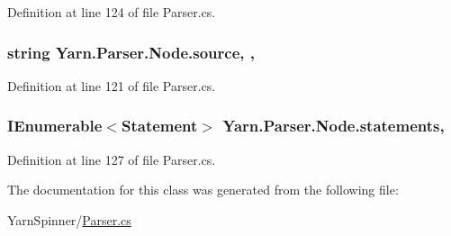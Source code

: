 Definition at line 124 of file Parser.\-cs.

\hypertarget{a00132_a005a6b0f614beb77708fc5ce8fea66e1}{
\subsubsection[{source}]{\setlength{\rightskip}{0pt plus 5cm}string Yarn.\-Parser.\-Node.\-source\hspace{0.3cm}{\ttfamily [get]}, {\ttfamily [set]}, {\ttfamily [package]}}}\label{a00132_a005a6b0f614beb77708fc5ce8fea66e1}


Definition at line 121 of file Parser.\-cs.

\hypertarget{a00132_abdae3fb1c6927b38ce29b1b71a00cb12}{
\subsubsection[{statements}]{\setlength{\rightskip}{0pt plus 5cm}I\-Enumerable$<${\bf Statement}$>$ Yarn.\-Parser.\-Node.\-statements\hspace{0.3cm}{\ttfamily [get]}, {\ttfamily [package]}}}\label{a00132_abdae3fb1c6927b38ce29b1b71a00cb12}


Definition at line 127 of file Parser.\-cs.



The documentation for this class was generated from the following file\-:\begin{DoxyCompactItemize}
\item 
Yarn\-Spinner/\hyperlink{a00301}{Parser.\-cs}\end{DoxyCompactItemize}

